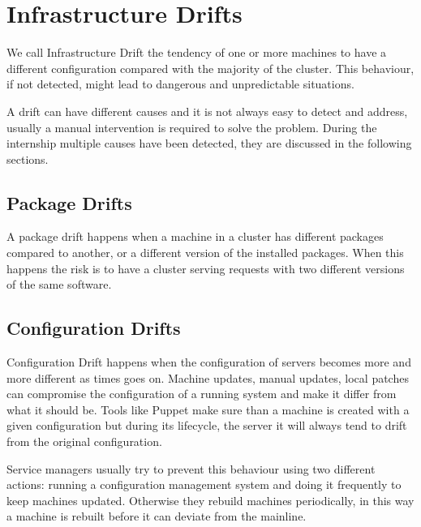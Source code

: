 \section{Infrastructure Drifts}

We call Infrastructure Drift the tendency of one or more machines to have
a different configuration compared with the majority of the cluster. This
behaviour, if not detected, might lead to dangerous and unpredictable
situations.

A drift can have different causes and it is not always easy to detect and
address, usually a manual intervention is required to solve the problem.
During the internship multiple causes have been detected, they are
discussed in the following sections.

\subsection{Package Drifts}

A package drift happens when a machine in a cluster has different packages
compared to another, or a different version of the installed packages.
When this happens the risk is to have a cluster serving requests with two
different versions of the same software.

\subsection{Configuration Drifts}

Configuration Drift happens when the configuration of servers becomes more
and more different as times goes on. Machine updates, manual updates,
local patches can compromise the configuration of a running system and
make it differ from what it should be. Tools like Puppet make sure than
a machine is created with a given configuration but during its lifecycle,
the server it will always tend to drift from the original configuration.

Service managers usually try to prevent this behaviour using two different
actions: running a configuration management system and doing it frequently
to keep machines updated. Otherwise they rebuild machines periodically, in
this way a machine is rebuilt before it can deviate from the mainline.
